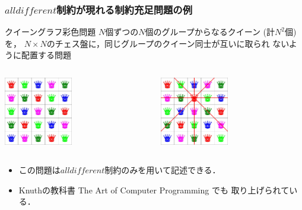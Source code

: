 \documentclass [dvipdfmx,11pt]{beamer}
\newcommand{\alldifferent}{$alldifferent$}
\begin{document}
\begin{frame}
    \frametitle{{\alldifferent}制約が現れる制約充足問題の例}
    \begin{block}{クイーングラフ彩色問題}
        $N$個ずつの$N$個のグループからなるクイーン (計$N^2$個) を，
        $N\times N$のチェス盤に，同じグループのクイーン同士が互いに取られ
        ないように配置する問題
    \end{block}
    \begin{exampleblock}{}\centering
        \begin{columns}
            \begin{column}{0.48\textwidth}\centering
                \includegraphics[width=3cm]{images/qgcp_5.jpg}
            \end{column}
            \begin{column}{0.48\textwidth}\centering
                \includegraphics[width=3cm]{images/qgcp_5_c.jpg}
            \end{column}
        \end{columns}
    \end{exampleblock}
    \begin{itemize}
        \item この問題は{\alldifferent}制約のみを用いて記述できる．
        \item Knuthの教科書 The Art of Computer Programming でも
            取り上げられている．
    \end{itemize}
\end{frame}
\end{document}
